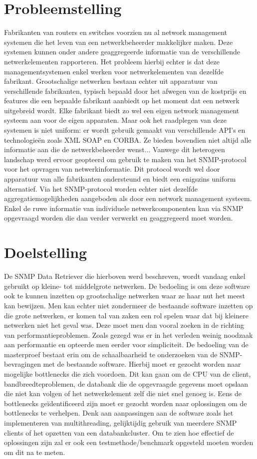 \section{Probleemstelling}
Fabrikanten van routers en switches voorzien nu al network management systemen die het leven van een netwerkbeheerder makkelijker maken.
Deze systemen kunnen onder andere geaggregeerde informatie van de verschillende netwerkelementen rapporteren.
Het probleem hierbij echter is dat deze managementsystemen enkel werken voor netwerkelementen van dezelfde fabrikant.
Grootschalige netwerken bestaan echter uit apparatuur van verschillende fabrikanten,
typisch bepaald door het afwegen van de kostprijs en features die een bepaalde fabrikant aanbiedt op het moment dat een netwerk uitgebreid wordt. %
Elke fabrikant biedt zo wel een eigen network management systeem aan voor de eigen apparaten.
Maar ook het raadplegen van deze systemen is niet uniform: er wordt gebruik gemaakt van verschillende API's en technologieën zoals XML SOAP en CORBA.
Ze bieden bovendien niet altijd alle informatie aan die de netwerkbeheerder wenst...
Vanwege dit heterogeen landschap werd ervoor geopteerd om gebruik te maken van het SNMP-protocol voor het opvragen van netwerkinformatie.
Dit protocol wordt wel door apparatuur van alle fabrikanten ondersteund en biedt een enigszins uniform alternatief.
Via het SNMP-protocol worden echter niet dezelfde aggregatiemogelijkheden aangeboden als door een network management systeem.
Enkel de ruwe informatie van individuele netwerkcomponenten kan via SNMP opgevraagd worden die dan verder verwerkt en geaggregeerd moet worden.


\section{Doelstelling}
De SNMP Data Retriever die hierboven werd beschreven, wordt vandaag enkel gebruikt op kleine- tot middelgrote netwerken.
De bedoeling is om deze software ook te kunnen inzetten op grootschalige netwerken waar ze haar nut het meest kan bewijzen.
Men kan echter niet zondermeer de bestaande software inzetten op die grote netwerken, er komen tal van zaken een rol spelen
waar dat bij kleinere netwerken niet het geval was. Deze moet men dan vooral zoeken in de richting van performantieproblemen.
Zoals gezegd was er in het verleden weinig noodzaak aan performantie en opteerde men eerder voor simpliciteit.
De bedoeling van de masterproef bestaat erin om de schaalbaarheid te onderzoeken van de SNMP-bevragingen met de bestaande software.
Hierbij moet er gezocht worden naar mogelijke bottlenecks die zich voordoen.
Dit kan gaan om de CPU van de client, bandbreedteproblemen, de databank die de opgevraagde gegevens moet opslaan die niet kan volgen of
het netwerkelement zelf die niet snel genoeg is.
Eens de bottlenecks geïdentificeerd zijn moet er gezocht worden naar oplossingen om de bottlenecks te verhelpen.
Denk aan aanpassingen aan de software zoals het implementeren van multithreading, gelijktijdig gebruik van meerdere SNMP clients of
het opzetten van een databankcluster.
Om te zien hoe effectief de oplossingen zijn zal er ook een testmethode/benchmark opgesteld moeten worden om dit na te meten.


